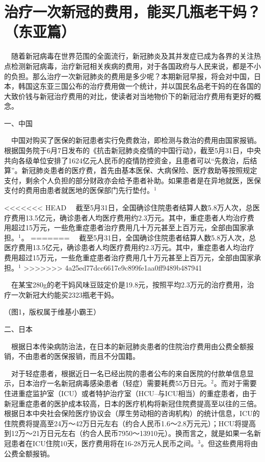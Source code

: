 \documentclass[
]{article}
\begin{document}
\vspace{-5mm}

\hypertarget{section}{%
\section{\texorpdfstring{\textcolor{glaucous}{\Huge 治疗一次新冠的费用，能买几瓶老干妈？（东亚篇）}}{}}\label{section}}

\vspace{-3mm}

\(\quad\)随着新冠病毒在世界范围的全面流行，新冠肺炎及其并发症已成为各界的关注热点检测新冠病毒，治疗新冠相关疾病的费用，对于各国政府与人民来说，都是不小的负担。那么治疗一次新冠肺炎的费用是多少呢？本期新冠早报，将会对中国，日本，韩国这东亚三国公布的治疗费用做一个统计，并以国民名品老干妈的在各国的大致价钱与新冠治疗费用的对比，使读者对当地物价下的新冠治疗费用有更好的概念。

一、中国

\(\quad\)中国对购买了医保的新冠患者实行免费救治，即检测与救治的费用由国家报销。根据国务院于6月7日发布的《抗击新冠肺炎疫情的中国行动》，截至5月31日，中央共向各级单位安排了1624亿元人民币的疫情防控资金，且患者可以``先救治，后结算''。新冠肺炎患者的医疗费，首先由基本医保、大病保险、医疗救助等按照规定支付，剩余个人负担的部分财政亦会给予患者补助。如果患者是在异地就医，医保支付的费用由患者就医地的医保部门先行垫付。\(^1\)

<<<<<<< HEAD
\(\quad\)截至5月31日，全国确诊住院患者结算人数5.8万人次，总医疗费用13.5亿元，确诊患者人均医疗费用约2.3万元。其中，重症患者人均治疗费用超过15万元，一些危重症患者治疗费用几十万元甚至上百万元，全部由国家承担。\(^1\)。
=======
\(\quad\)截至5月31日，全国确诊住院患者结算人数5.8万人次，总医疗费用13.5亿元，确诊患者人均医疗费用约2.3万元。其中，重症患者人均治疗费用超过15万元，一些危重症患者治疗费用几十万元甚至上百万元，全部由国家承担。\(^1\)
>>>>>>> 4a25ed77dcc6617e9c899fe1aa0ff9489b487941

\(\quad\)在某宝280g的老干妈风味豆豉定价是19.8元，按照平均2.3万元的治疗费用，治疗一次新冠大约能买2323瓶老干妈。

\vspace{5mm}

\Large （图1，版权属于维基小霸王）

二、日本

\(\quad\)根据日本传染病防治法，在日本的新冠肺炎患者的住院治疗费用由公费全额报销，不由患者的医保报销，而且不分国籍。

\(\quad\)对于轻症患者，根据近日一名已经出院的患者公布的来自医院的付款单信息显示，日本治疗一名新冠病毒感染患者（轻症）需要耗费55万日元。\(^2\)。而对于需要住进重症监护室（ICU）或者特护治疗室（HCU--与ICU相当）的重症患者，由于新冠重症患者的医护成本较高，日本的医疗机构将新冠住院费提高至以往的三倍。根据日本中央社会保险医疗协议会（厚生劳动相的咨询机构）的统计信息，ICU的住院费将提高至24万～42万日元左右（约合人民币1.6～2.8万元元）；HCU将提高到12万～21万日元左右（约合人民币7950～13910元）。换而言之，就是如果一名新冠患者在ICU住院10天，医疗费用将在16-28万元人民币之间。\(^3\)。但这些费用将由公费全额报销。
\end{document}
